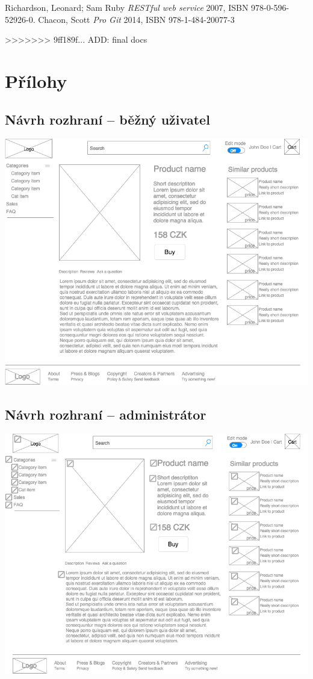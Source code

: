 \documentclass[11pt,a4paper]{article}
\begin{document}
\begin{thebibliography}{1}

   Richardson, Leonard; Sam Ruby {\em  RESTful web service} 2007, ISBN 978-0-596-52926-0.
   Chacon, Scott {\em Pro Git} 2014, ISBN 978-1-484-20077-3

\end{thebibliography}
>>>>>>> 9ff189f... ADD: final docs

\section*{Přílohy}

\subsection*{Návrh rozhraní -- běžný uživatel}
\includegraphics[scale=0.6]{pyngshop.png}
\subsection*{Návrh rozhraní -- administrátor}
\includegraphics[scale=0.6]{pyngshop_edit.png}
\newpage
\end{document}
